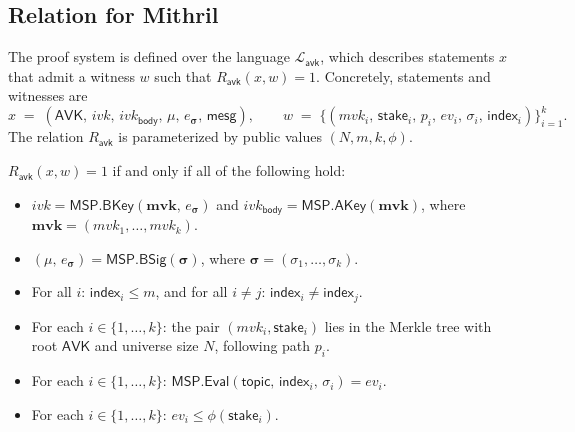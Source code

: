 \documentclass{article}
\begin{document}


\subsection{Relation for Mithril}

The proof system is defined over the language $\mathcal{L}_{\mathsf{avk}}$, which describes statements $x$ that admit a witness $w$ such that $R_{\mathsf{avk}}(x,w)=1$. Concretely, statements and witnesses are
\[
  x \;=\; (\mathsf{AVK},\, ivk,\, ivk_{\mathsf{body}},\, \mu,\, e_{\boldsymbol{\sigma}},\, \mathsf{mesg}) ,
  \qquad
  w \;=\; \big\{(mvk_i,\, \mathsf{stake}_i,\, p_i,\, ev_i,\, \sigma_i,\, \mathsf{index}_i)\big\}_{i=1}^{k}.
\]
The relation $R_{\mathsf{avk}}$ is parameterized by public values $(N, m, k, \phi)$.

\medskip
\noindent $R_{\mathsf{avk}}(x,w)=1$ if and only if all of the following hold:
\begin{itemize}
  \item $ivk=\mathsf{MSP.BKey}(\mathbf{mvk},\, e_{\boldsymbol{\sigma}})$ and $ivk_{\mathsf{body}}=\mathsf{MSP.AKey}(\mathbf{mvk})$, where $\mathbf{mvk}=(mvk_1,\ldots,mvk_k)$.
  \item $(\mu,\, e_{\boldsymbol{\sigma}})=\mathsf{MSP.BSig}(\boldsymbol{\sigma})$, where $\boldsymbol{\sigma}=(\sigma_1,\ldots,\sigma_k)$.
  \item For all $i$: $\mathsf{index}_i \le m$, and for all $i\neq j$: $\mathsf{index}_i \neq \mathsf{index}_j$.
  \item For each $i\in\{1,\ldots,k\}$: the pair $(mvk_i,\mathsf{stake}_i)$ lies in the Merkle tree with root $\mathsf{AVK}$ and universe size $N$, following path $p_i$.
  \item For each $i\in\{1,\ldots,k\}$: $\mathsf{MSP.Eval}(\mathsf{topic},\, \mathsf{index}_i,\, \sigma_i)=ev_i$.
  \item For each $i\in\{1,\ldots,k\}$: $ev_i \le \phi(\mathsf{stake}_i)$.
\end{itemize}
\end{document}
